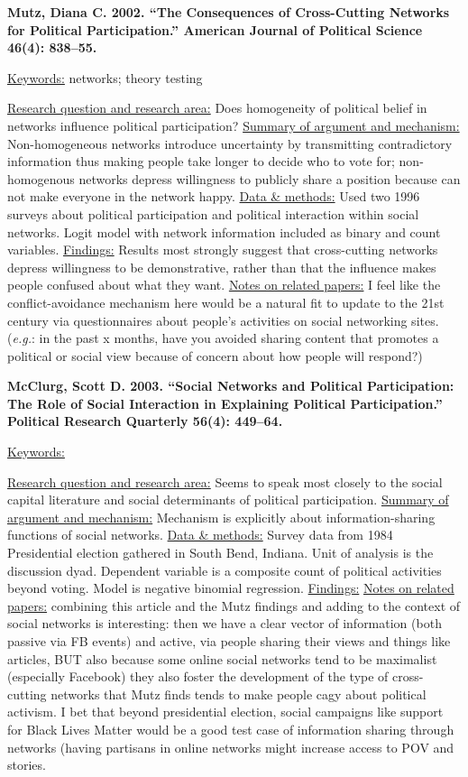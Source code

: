 \documentclass{article}[12pt]
\begin{document}
\textbf{Mutz, Diana C. 2002. “The Consequences of Cross-Cutting Networks for Political Participation.” American Journal of Political Science 46(4): 838–55.}

\underline{Keywords:} networks; theory testing

\underline{Research question and research area:} Does homogeneity of political belief in networks influence political participation?
\underline{Summary of argument and mechanism:} Non-homogeneous networks introduce uncertainty by transmitting contradictory information thus making people take longer to decide who to vote for; non-homogenous networks depress willingness to publicly share a position because can not make everyone in the network happy.
\underline{Data \& methods:} Used two 1996 surveys about political participation and political interaction within social networks. Logit model with network information included as binary and count variables.
\underline{Findings:} Results most strongly suggest that cross-cutting networks depress willingness to be demonstrative, rather than that the influence makes people confused about what they want.
\underline{Notes on related papers:} I feel like the conflict-avoidance mechanism here would be a natural fit to update to the 21st century via questionnaires about people's activities on social networking sites. (\textit{e.g.}: in the past x months, have you avoided sharing content that promotes a political or social view because of concern about how people will respond?)

\textbf{McClurg, Scott D. 2003. “Social Networks and Political Participation: The Role of Social Interaction in Explaining Political Participation.” Political Research Quarterly 56(4): 449–64.}

\underline{Keywords:}

\underline{Research question and research area:} Seems to speak most closely to the social capital literature and social determinants of political participation. 
\underline{Summary of argument and mechanism:} Mechanism is explicitly about information-sharing functions of social networks.
\underline{Data \& methods:} Survey data from 1984 Presidential election gathered in South Bend, Indiana. Unit of analysis is the discussion dyad. Dependent variable is a composite count of political activities beyond voting. Model is negative binomial regression.
\underline{Findings:} 
\underline{Notes on related papers:}
combining this article and the  Mutz findings and adding to the context  of social networks is interesting:
then we have a  clear vector of information (both  passive via FB  events) and active,  via people sharing  their views and  things like articles,  BUT also because some online social networks tend to be maximalist (especially Facebook) they also foster the  development of the type of cross- cutting networks that Mutz finds tends to make people cagy about political activism. I bet that beyond presidential election, social campaigns like support for Black Lives Matter would be a good test case of information sharing through networks (having partisans in online networks might increase access to POV and stories.
\end{document}
